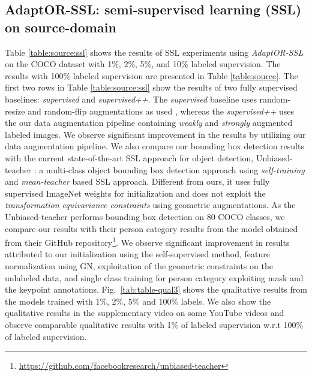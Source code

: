 \subsection{AdaptOR-SSL: semi-supervised learning (SSL) on source-domain}
Table \ref{table:source:ssl} shows the results of SSL experiments using \emph{AdaptOR-SSL} on the COCO dataset with 1\%, 2\%, 5\%, and 10\% labeled supervision. The results with 100\% labeled supervision are presented in Table \ref{table:source}. The first two rows in Table \ref{table:source:ssl} show the results of two fully supervised baselines: \emph{supervised} and \emph{supervised++}. The \emph{supervised} baseline uses random-resize and random-flip augmentations as used \citep{he2017mask}, whereas the \emph{supervised++} uses the our data augmentation pipeline containing \emph{weakly} and \emph{strongly} augmented labeled images. We observe significant improvement in the results by utilizing our data augmentation pipeline. We also compare our bounding box detection results with the current state-of-the-art SSL approach for object detection, Unbiased-teacher \citep{liu2021unbiased}: a multi-class object bounding box detection approach using \emph{self-training} and \emph{mean-teacher} based SSL approach. Different from ours, it uses fully supervised ImageNet weights for initialization and does not exploit the \emph{transformation equivariance constraints} using geometric augmentations. As the Unbiased-teacher performs bounding box detection on 80 COCO classes, we compare our results with their person category results \emph{} from the model obtained from their GitHub repository\footnote{\url{https://github.com/facebookresearch/unbiased-teacher}}. We observe significant improvement in results attributed to our initialization using the self-supervised method, feature normalization using GN, exploitation of the geometric constraints on the unlabeled data, and single class training for person category exploiting mask and the keypoint annotations. Fig.~\ref{tab:table-qual3} shows the qualitative results from the models trained with 1\%, 2\%, 5\% and 100\% labels. We also show the qualitative results in the supplementary video on some YouTube videos and observe comparable qualitative results with 1\% of labeled supervision w.r.t 100\% of labeled supervision.

